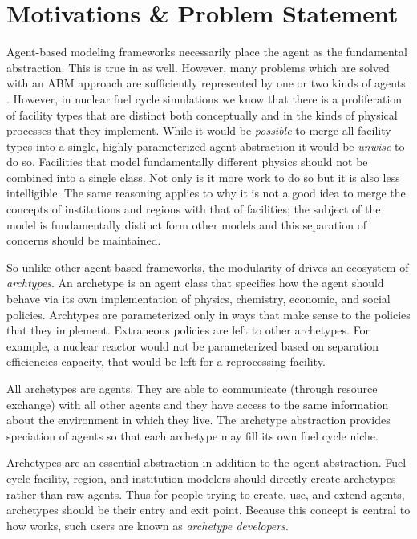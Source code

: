 \section{Motivations \& Problem Statement}
\label{sec-motive}

Agent-based modeling frameworks necessarily place the agent as the fundamental 
abstraction. This is true in \cyclus as well. However, many problems which are 
solved with an ABM approach are sufficiently represented by one or two kinds of 
agents \citeme. However, in nuclear fuel cycle simulations we know that there is
a proliferation of facility types that are distinct both conceptually and in the 
kinds of physical processes that they implement. While it would be \emph{possible}
to merge all facility types into a single, highly-parameterized agent abstraction
it would be \emph{unwise} to do so. Facilities that model fundamentally different
physics should not be combined into a single class. Not only is it more work to 
do so but it is also less intelligible. The same reasoning applies to why it is 
not a good idea to merge the concepts of institutions and regions with that of
facilities; the subject of the model is fundamentally distinct form other models
and this separation of concerns should be maintained.

So unlike other agent-based frameworks, the modularity of \cyclus drives 
an ecosystem of \emph{archtypes}. An archetype is an agent class that specifies 
how the agent should behave via its own implementation of physics, chemistry, 
economic, and social policies. Archtypes are parameterized only in ways that 
make sense to the policies that they implement. Extraneous policies are left to 
other archetypes. For example, a nuclear reactor would not be parameterized based 
on separation efficiencies capacity, that would be left for a reprocessing facility.

All archetypes are agents. They are able to communicate (through resource 
exchange) with all other agents and they have access to the same information 
about the environment in which they live. The archetype abstraction provides
speciation of agents so that each archetype may fill its own fuel cycle niche.

Archetypes are an essential abstraction in addition to the agent abstraction. 
Fuel cycle facility, region, and institution modelers should directly create
archetypes rather than raw agents. Thus for people trying to create, use, and 
extend \cyclus agents, archetypes should be their entry and exit point. Because this 
concept is central to how \cyclus works, such users are known as \emph{archetype
developers}.

